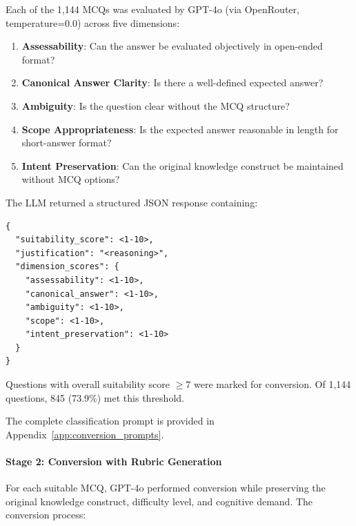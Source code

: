 Each of the 1,144 MCQs was evaluated by GPT-4o (via OpenRouter, temperature=0.0) across five dimensions:

\begin{enumerate}
    \item \textbf{Assessability}: Can the answer be evaluated objectively in open-ended format?
    \item \textbf{Canonical Answer Clarity}: Is there a well-defined expected answer?
    \item \textbf{Ambiguity}: Is the question clear without the MCQ structure?
    \item \textbf{Scope Appropriateness}: Is the expected answer reasonable in length for short-answer format?
    \item \textbf{Intent Preservation}: Can the original knowledge construct be maintained without MCQ options?
\end{enumerate}

The LLM returned a structured JSON response containing:
\begin{verbatim}
{
  "suitability_score": <1-10>,
  "justification": "<reasoning>",
  "dimension_scores": {
    "assessability": <1-10>,
    "canonical_answer": <1-10>,
    "ambiguity": <1-10>,
    "scope": <1-10>,
    "intent_preservation": <1-10>
  }
}
\end{verbatim}

Questions with overall suitability score $\geq 7$ were marked for conversion. Of 1,144 questions, 845 (73.9\%) met this threshold.

The complete classification prompt is provided in Appendix~\ref{app:conversion_prompts}.

\paragraph{Stage 2: Conversion with Rubric Generation}

For each suitable MCQ, GPT-4o performed conversion while preserving the original knowledge construct, difficulty level, and cognitive demand. The conversion process:

